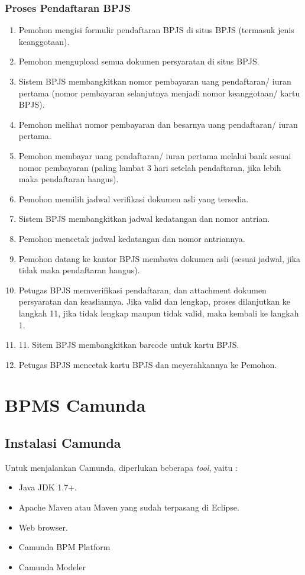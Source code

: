 \subsubsection{Proses Pendaftaran BPJS}
\begin{enumerate}
	\item Pemohon mengisi formulir pendaftaran BPJS di situs BPJS (termasuk jenis keanggotaan).
	\item Pemohon mengupload semua dokumen persyaratan di situs BPJS.
	\item Sistem BPJS membangkitkan nomor pembayaran uang pendaftaran/ iuran pertama (nomor pembayaran selanjutnya menjadi nomor keanggotaan/ kartu BPJS).
  \item Pemohon melihat nomor pembayaran dan besarnya uang pendaftaran/ iuran pertama.
  \item Pemohon membayar uang pendaftaran/ iuran pertama melalui bank sesuai nomor pembayaran (paling lambat 3 hari setelah pendaftaran, jika lebih maka pendaftaran hangus).
  \item Pemohon memilih jadwal verifikasi dokumen asli yang tersedia.
  \item Sistem BPJS membangkitkan jadwal kedatangan dan nomor antrian.
  \item Pemohon mencetak jadwal kedatangan dan nomor antriannya.
  \item Pemohon datang ke kantor BPJS membawa dokumen asli (sesuai jadwal, jika tidak maka pendaftaran hangus). 
  \item Petugas BPJS memverifikasi pendaftaran, dan attachment dokumen persyaratan dan keasliannya. Jika valid dan lengkap, proses dilanjutkan ke langkah 11, jika tidak lengkap maupun tidak valid, maka kembali ke langkah 1.
	\item 11. Sitem BPJS membangkitkan barcode untuk kartu BPJS.
  \item Petugas BPJS mencetak kartu BPJS dan meyerahkannya ke Pemohon.
\end{enumerate}


\section{BPMS Camunda}
\subsection{Instalasi Camunda}
\label{instalasicamunda}
Untuk menjalankan Camunda, diperlukan beberapa \textit{tool}\cite{bpmngetstarted:15:camunda}, yaitu :
\begin{itemize}
	\item Java JDK 1.7+.
	\item Apache Maven atau Maven yang sudah terpasang di Eclipse.
	\item Web browser.
	\item Camunda BPM Platform 
	\item Camunda Modeler
\end{itemize}


